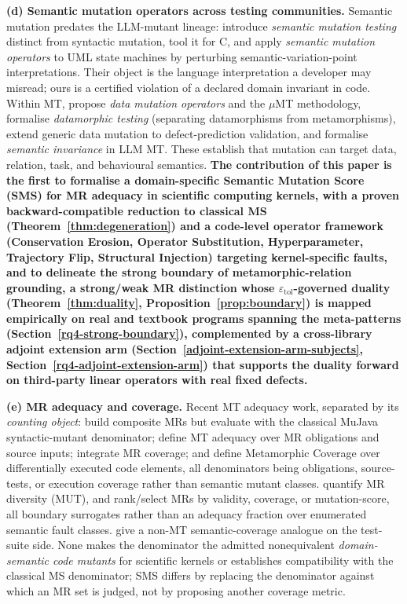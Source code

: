 \documentclass[manuscript,screen,review]{acmart}
\begin{document}
\textbf{(d) Semantic mutation operators across testing communities.}
Semantic mutation predates the LLM-mutant lineage: \citet{clark2010semanticmut}
introduce \emph{semantic mutation testing} distinct from syntactic mutation,
\citet{dan2012smtc} tool it for C, and \citet{derezinska2019uml} apply
\emph{semantic mutation operators} to UML state machines by perturbing
semantic-variation-point interpretations. Their object is the language
interpretation a developer may misread; ours is a certified violation of a
declared domain invariant in code. Within MT, \citet{sun2016mumt,sun2024datamutation}
propose \emph{data mutation operators} and the $\mu$MT methodology,
\citet{zhu2020datamorphic} formalise \emph{datamorphic testing} (separating
datamorphisms from metamorphisms), \citet{chan2024metamorphic} extend generic
data mutation to defect-prediction validation, and \citet{curto2025semanticinvariance}
formalise \emph{semantic invariance} in LLM MT. These establish that mutation can
target data, relation, task, and behavioural semantics.
\textbf{The contribution of this paper is the
first to formalise a domain-specific Semantic Mutation Score (SMS) for
MR adequacy in scientific computing kernels, with a proven
backward-compatible reduction to classical MS (Theorem~\ref{thm:degeneration}) and a
code-level operator framework (Conservation Erosion, Operator
Substitution, Hyperparameter, Trajectory Flip, Structural Injection)
targeting kernel-specific faults, and to delineate the strong boundary
of metamorphic-relation grounding, a strong/weak MR distinction whose
$\varepsilon_{\mathrm{tol}}$-governed duality (Theorem~\ref{thm:duality}, Proposition~\ref{prop:boundary})
is mapped empirically on real and textbook programs spanning the
meta-patterns (Section~\ref{rq4-strong-boundary}), complemented by a cross-library adjoint extension
arm (Section~\ref{adjoint-extension-arm-subjects}, Section~\ref{rq4-adjoint-extension-arm}) that supports the duality forward on third-party
linear operators with real fixed defects.}

\textbf{(e) MR adequacy and coverage.} Recent MT adequacy work, separated by its
\emph{counting object}: \citet{xiang2019compositeMR} build composite MRs but
evaluate with the classical MuJava syntactic-mutant denominator;
\citet{fu2024mtadequacy} define MT adequacy over MR obligations and source
inputs; \citet{liu2024mtcoverage} integrate MR coverage; and
\citet{ba2025metamorphiccoverage} define Metamorphic Coverage over
differentially executed code elements, all denominators being obligations,
source-tests, or execution coverage rather than semantic mutant classes.
\citet{xie2024mutmodel} quantify MR diversity (MUT), and
\citet{huang2022mrprioritization,zhang2022effectivemrselection} rank/select MRs
by validity, coverage, or mutation-score, all boundary surrogates rather than an
adequacy fraction over enumerated semantic fault classes.
\citet{alblwi2023semanticcoverage} give a non-MT semantic-coverage analogue on
the test-suite side. None makes the denominator the admitted nonequivalent
\emph{domain-semantic code mutants} for scientific kernels or establishes
compatibility with the classical MS denominator; SMS differs by replacing the
denominator against which an MR set is judged, not by proposing another coverage
metric.
\end{document}
